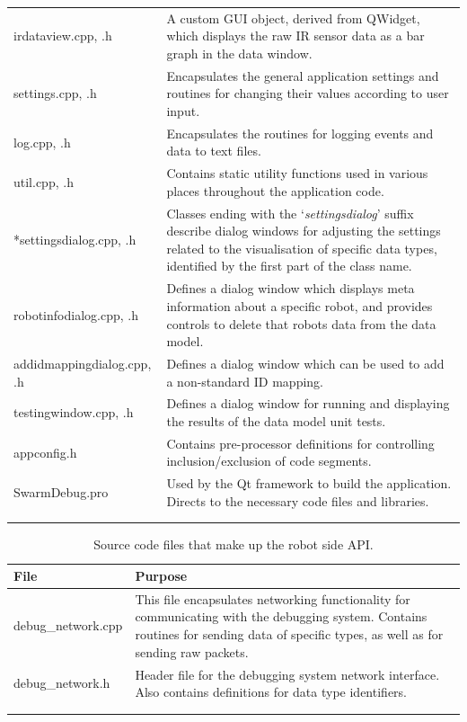 \begin{longtable}{ l p{10cm} }
 irdataview.cpp, .h & A custom GUI object, derived from QWidget, which displays the raw IR sensor data as a bar graph in the data window.\\
 settings.cpp, .h & Encapsulates the general application settings and routines for changing their values according to user input.\\
 log.cpp, .h & Encapsulates the routines for logging events and data to text files.\\
 util.cpp, .h & Contains static utility functions used in various places throughout the application code.\\
 *settingsdialog.cpp, .h & Classes ending with the `\textit{settingsdialog}' suffix describe dialog windows for adjusting the settings related to the visualisation of specific data types, identified by the first part of the class name.\\
 robotinfodialog.cpp, .h & Defines a dialog window which displays meta information about a specific robot, and provides controls to delete that robots data from the data model.\\
 addidmappingdialog.cpp, .h & Defines a dialog window which can be used to add a non-standard ID mapping.\\
 testingwindow.cpp, .h & Defines a dialog window for running and displaying the results of the data model unit tests.\\
 appconfig.h & Contains pre-processor definitions for controlling inclusion/exclusion of code segments.\\
 SwarmDebug.pro & Used by the Qt framework to build the application. Directs to the necessary code files and libraries.\\
 \bottomrule\\
	
 \label{tab:CodeFiles}
\end{longtable}

\begin{longtable}{ l p{10cm} }
\caption[Robot-side Code Files]{Source code files that make up the robot side API.}\\
 File & Purpose\\
 \hline
 debug\_network.cpp & This file encapsulates networking functionality for communicating with the debugging system. Contains routines for sending data of specific types, as well as for sending raw packets.\\
 debug\_network.h & Header file for the debugging system network interface. Also contains definitions for data type identifiers.\\
 \bottomrule\\
	
 \label{tab:RobotCodeFiles}
\end{longtable}

